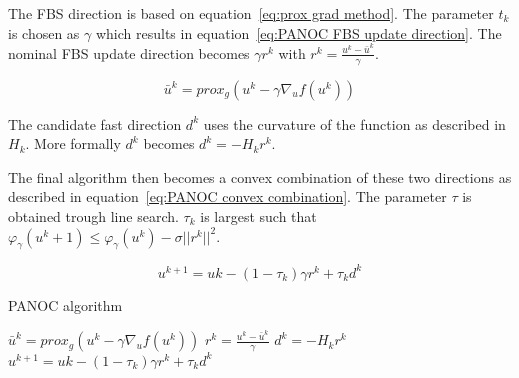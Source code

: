 \documentclass[]{article}
\begin{document}
		The FBS direction is based on equation~\ref{eq:prox grad method}. The parameter $t_k$ is chosen as $\gamma$ which results in equation~\ref{eq:PANOC FBS update direction}. The nominal FBS update direction becomes $\gamma r^k$ with $r^k= \frac{u^k - \bar{u}^k}{\gamma}$.
		
		\begin{equation}
			\bar{u}^k = prox_g(u^k - \gamma \nabla_u f(u^k))
			\label{eq:PANOC FBS update direction}
		\end{equation}
		
		The candidate fast direction $d^k$ uses the curvature of the function as described in $H_k$. More formally $d^k$ becomes $d^k=-H_kr^k$.
		
		The final algorithm then becomes a convex combination of these two directions as described in equation~\ref{eq:PANOC convex combination}. The parameter $\tau$ is obtained trough line search. $\tau_k$ is largest such that $\varphi_\gamma(u^k+1) \leq \varphi_\gamma(u^k) - \sigma||r^k||^2$.
		
		\begin{equation}
			u^{k+1} = uk - (1-\tau_k)\gamma r^k + \tau_kd^k
			\label{eq:PANOC convex combination}
		\end{equation}
		
		\begin{algorithm}
			\caption{PANOC algorithm}
			\label{alg:PANOC alg}
			\begin{algorithmic}[1]
						\State $\bar{u}^k = prox_g(u^k - \gamma \nabla_u f(u^k))$
						\State $r^k= \frac{u^k - \bar{u}^k}{\gamma}$
						\State $d^k=-H_kr^k$
						\State $u^{k+1} = uk - (1-\tau_k)\gamma r^k + \tau_kd^k$
					\EndFor
				\EndProcedure
			\end{algorithmic}
		\end{algorithm}
		
\end{document}
